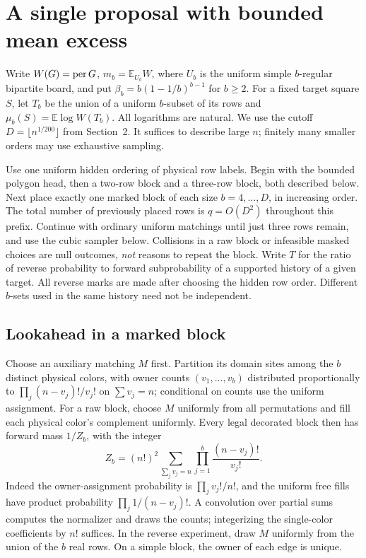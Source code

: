\section{A single proposal with bounded mean excess}
\label{sec:lookahead-cubic}

Write $W(G)=\operatorname{per} G$, $m_b=\mathbb E_{U_b}W$, where $U_b$ is the
uniform simple $b$-regular bipartite board, and put
$\beta_b=b(1-1/b)^{b-1}$ for $b\ge2$. For a fixed target square $S$, let
$T_b$ be the union of a uniform $b$-subset of its rows and
$\mu_b(S)=\mathbb E\log W(T_b)$. All logarithms are natural.
We use the cutoff $D=\lfloor n^{1/200}\rfloor$ from Section~2. It suffices to
describe large $n$; finitely many smaller orders may use exhaustive sampling.

Use one uniform hidden ordering of physical row labels. Begin with the
bounded polygon head, then a two-row block and a three-row block, both described below.
Next place exactly one marked block of each size $b=4,\ldots,D$, in increasing
order. The total number of previously placed rows is $q=O(D^2)$ throughout
this prefix. Continue with ordinary uniform matchings until just three rows
remain, and use the cubic sampler below. Collisions in a raw block or
infeasible masked choices are null outcomes, \emph{not} reasons to repeat the
block. Write $T$ for the ratio of reverse probability to forward subprobability
of a supported history of a given target. All reverse marks are made after
choosing the hidden row order. Different $b$-sets used in the same history
need not be independent.

\subsection{Lookahead in a marked block}

Choose an auxiliary matching $M$ first. Partition its domain sites among
the $b$ distinct physical colors, with owner counts $(v_1,\ldots,v_b)$
distributed proportionally to $\prod_j(n-v_j)!/v_j!$ on $\sum v_j=n$;
conditional on counts use the uniform assignment. For a raw block, choose
$M$ uniformly from all permutations and fill each physical color's
complement uniformly. Every legal decorated block then has forward mass
$1/Z_b$, with the integer
\begin{equation}\label{eq:v2-Zb}
 Z_b=(n!)^2\sum_{\sum_j v_j=n}\prod_{j=1}^b\frac{(n-v_j)!}{v_j!}.
\end{equation}
Indeed the owner-assignment probability is $\prod_j v_j!/n!$, and the
uniform free fills have product probability $\prod_j 1/(n-v_j)!$.
A convolution over partial sums computes the normalizer and draws the
counts; integerizing the single-color coefficients by $n!$ suffices.
In the reverse experiment, draw $M$ uniformly from the union of the
$b$ real rows. On a simple block, the owner of each edge is unique.

